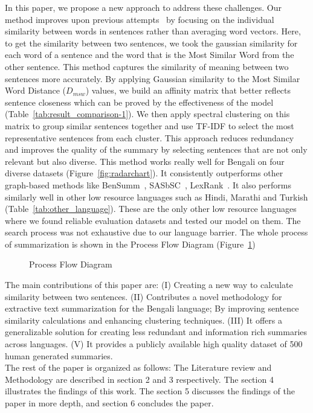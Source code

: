 In this paper, we propose a new approach to address these challenges.
Our method improves upon previous
attempts~\cite{roychowdhury-etal-2022-spectral-base}
by focusing on the individual similarity between words
in sentences rather than averaging word vectors.
Here, to get the similarity between two sentences,
we took the gaussian similarity for each word of a sentence and
the word that is the Most Similar Word from the other sentence.
This method captures the similarity of meaning between
two sentences more accurately.
By applying Gaussian similarity to the Most Similar
Word Distance ($D_{msw}$) values, we build an affinity matrix that
better reflects sentence closeness which can be proved
by the effectiveness of the model (Table~\ref{tab:result_comparison-1}).
We then apply spectral clustering on this matrix to
group similar sentences together and use TF-IDF to select the
most representative sentences from each cluster.
This approach reduces redundancy and improves the
quality of the summary by selecting sentences that are not only
relevant but also diverse.
This method works really well for Bengali on four
diverse datasets (Figure~\ref{fig:radarchart}).
It consistently outperforms other graph-based methods
like BenSumm~\cite{chowdhury-etal-2021-tfidf-clustering},
SASbSC~\cite{roychowdhury-etal-2022-spectral-base},
LexRank~\cite{Erkan-lexRank-2004}.
It also performs similarly well in other low resource languages such as
Hindi, Marathi and Turkish (Table~\ref{tab:other_language}).
These are the only other low resource languages
where we found reliable evaluation datasets and tested our model on them.
The search process was not exhaustive due to our language barrier.
The whole process of summarization is shown in the Process Flow Diagram (Figure~\ref{fig:process-flow-diagram})\\

\begin{figure}
    \centering
    
    \caption{Process Flow Diagram}
    \label{fig:process-flow-diagram}
\end{figure}

The main contributions of this paper are:
(I) Creating a new way to calculate similarity
between two sentences.
(II) Contributes a novel methodology for extractive
text summarization for the Bengali language;
By improving sentence similarity calculations and
enhancing clustering techniques.
(III)  It offers a generalizable solution for creating less
redundant and information rich summaries across languages.
(V) It provides a publicly available high quality dataset
of 500 human generated summaries.\\

The rest of the paper is organized as follows:
The Literature review and Methodology are described in
section 2 and 3 respectively.
The section 4 illustrates the findings of this work.
The section 5 discusses the findings of the paper in more depth,
and section 6 concludes the paper.